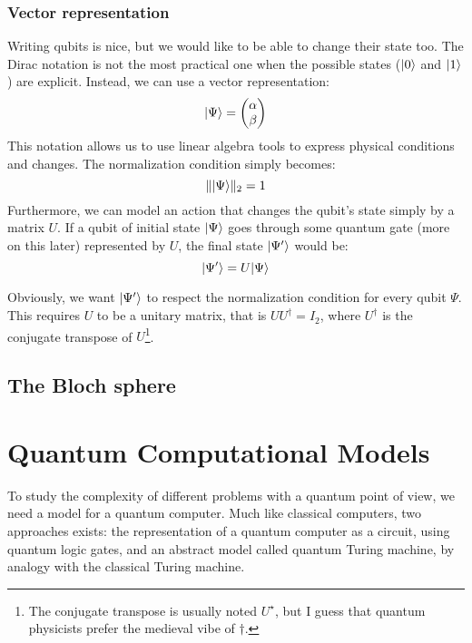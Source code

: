 \documentclass[12pt,a4paper]{article}
\DeclarePairedDelimiter\ket{\lvert}{\rangle}
\begin{document}
\subsubsection{Vector representation}
Writing qubits is nice, but we would like to be able to change their state too. The Dirac notation is not the most practical one when the possible states ($\ket{0}$ and $\ket{1}$) are explicit. Instead, we can use a vector representation:
\begin{equation*}
    \ket{\Psi} = \begin{pmatrix}\alpha\\\beta\end{pmatrix}
\end{equation*}
This notation allows us to use linear algebra tools to express physical conditions and changes. The normalization condition simply becomes:
\begin{equation*}
    \|\ket{\Psi}\|_2 = 1
\end{equation*}
Furthermore, we can model an action that changes the qubit's state simply by a matrix $U$. If a qubit of initial state $\ket{\Psi}$ goes through some quantum gate (more on this later) represented by $U$, the final state $\ket{\Psi'}$ would be:
\begin{equation*}
    \ket{\Psi'} = U\ket{\Psi}
\end{equation*}

Obviously, we want $\ket{\Psi'}$ to respect the normalization condition for every qubit $\Psi$. This requires $U$ to be a unitary matrix, that is $UU^\dagger = I_2$, where $U^\dagger$ is the conjugate transpose of $U$\footnote{The conjugate transpose is usually noted $U^\star$, but I guess that quantum physicists prefer the medieval vibe of $\dagger$.}.

\subsection{The Bloch sphere}


\section{Quantum Computational Models}
To study the complexity of different problems with a quantum point of view, we need a model for a quantum computer. Much like classical computers, two approaches exists: the representation of a quantum computer as a circuit, using quantum logic gates, and an abstract model called quantum Turing machine, by analogy with the classical Turing machine.
\end{document}
